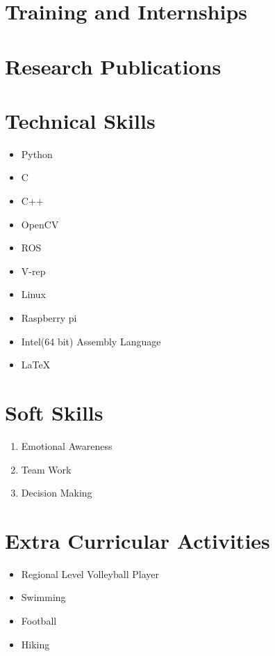 \documentclass[11pt,a4paper,sans]{moderncv} %
\begin{document}
\section{Training and Internships}

\section{Research Publications}

	
\section{Technical Skills}
	
	\begin{itemize}
		\item Python
		\item C
		\item C++
		\item OpenCV
		\item ROS
		\item V-rep
		\item Linux
		\item Raspberry pi
		\item Intel(64 bit) Assembly Language
		\item \LaTeX
		
		
		
	\end{itemize}
	
\section{Soft Skills}
	\begin{enumerate}
		
		\item Emotional Awareness
		\newline{}
		\item Team Work
		\newline{}
		\item Decision Making
		\newline{}
	\end{enumerate}

\section{Extra Curricular Activities}
		\begin{itemize}			
			\item Regional Level Volleyball Player
			\newline{}
			\item Swimming
			\newline{}
			\item Football
			\newline{}
			\item Hiking 
	\end{itemize}	
	
\end{document}
